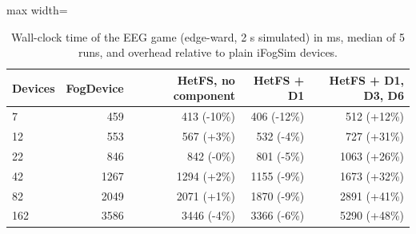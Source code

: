 \begin{table}[htbp]
\centering
\caption{Wall-clock time of the EEG game (edge-ward, 2 s simulated) in ms, median of 5 runs, and overhead relative to plain iFogSim devices.}
\label{tab:overhead}
\begin{adjustbox}{max width=\textwidth}
\begin{tabular}{lrrrr}
\toprule
Devices & FogDevice & HetFS, no component & HetFS + D1 & HetFS + D1, D3, D6 \\
\midrule
7 & 459 & 413 (-10\%) & 406 (-12\%) & 512 (+12\%) \\
12 & 553 & 567 (+3\%) & 532 (-4\%) & 727 (+31\%) \\
22 & 846 & 842 (-0\%) & 801 (-5\%) & 1063 (+26\%) \\
42 & 1267 & 1294 (+2\%) & 1155 (-9\%) & 1673 (+32\%) \\
82 & 2049 & 2071 (+1\%) & 1870 (-9\%) & 2891 (+41\%) \\
162 & 3586 & 3446 (-4\%) & 3366 (-6\%) & 5290 (+48\%) \\
\bottomrule
\end{tabular}
\end{adjustbox}
\end{table}
